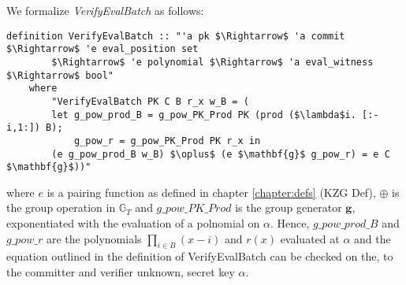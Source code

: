 We formalize \textit{VerifyEvalBatch} as follows: 
\begin{lstlisting}[language=isabelle]
    definition VerifyEvalBatch :: "'a pk $\Rightarrow$ 'a commit $\Rightarrow$ 'e eval_position set 
        $\Rightarrow$ 'e polynomial $\Rightarrow$ 'a eval_witness $\Rightarrow$ bool"
    where 
        "VerifyEvalBatch PK C B r_x w_B = (
        let g_pow_prod_B = g_pow_PK_Prod PK (prod ($\lambda$i. [:-i,1:]) B);
            g_pow_r = g_pow_PK_Prod PK r_x in
        (e g_pow_prod_B w_B) $\oplus$ (e $\mathbf{g}$ g_pow_r) = e C $\mathbf{g}$))"     
\end{lstlisting}
where $e$ is a pairing function as defined in chapter \ref{chapter:defs} (KZG Def), $\oplus$ is the group operation in $\mathbb{G}_T$ and $g\_pow\_PK\_Prod$ is the group generator $\mathbf{g}$, exponentiated with the evaluation of a polnomial on $\alpha$. Hence, $g\_pow\_prod\_B$ and $g\_pow\_r$ are the polynomials $\prod_{i\in B}^{}(x-i)$ and $r(x)$ evaluated at $\alpha$ and the equation outlined in the definition of VerifyEvalBatch can be checked on the, to the committer and verifier unknown, secret key $\alpha$.
